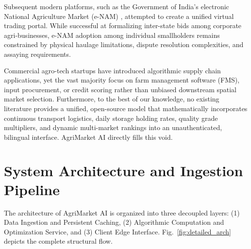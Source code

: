 \documentclass[conference]{IEEEtran}
\begin{document}
Subsequent modern platforms, such as the Government of India's electronic National Agriculture Market (e-NAM) \cite{b15}, attempted to create a unified virtual trading portal. While successful at formalizing inter-state bids among corporate agri-businesses, e-NAM adoption among individual smallholders remains constrained by physical haulage limitations, dispute resolution complexities, and assaying requirements. 

Commercial agro-tech startups have introduced algorithmic supply chain applications, yet the vast majority focus on farm management software (FMS), input procurement, or credit scoring rather than unbiased downstream spatial market selection. Furthermore, to the best of our knowledge, no existing literature provides a unified, open-source model that mathematically incorporates continuous transport logistics, daily storage holding rates, quality grade multipliers, and dynamic multi-market rankings into an unauthenticated, bilingual interface. AgriMarket AI directly fills this void.

\section{System Architecture and Ingestion Pipeline}

The architecture of AgriMarket AI is organized into three decoupled layers: (1) Data Ingestion and Persistent Caching, (2) Algorithmic Computation and Optimization Service, and (3) Client Edge Interface. Fig.~\ref{fig:detailed_arch} depicts the complete structural flow.
\end{document}
